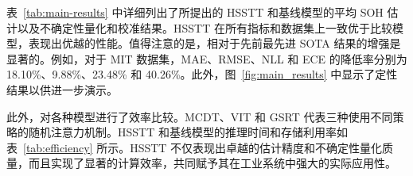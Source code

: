 \documentclass[UTF8,journal,twoside,web]{ieeecolor}
\begin{document}


表~\ref{tab:main-results} 中详细列出了所提出的 HSSTT 和基线模型的平均 SOH 估计以及不确定性量化和校准结果。HSSTT 在所有指标和数据集上一致优于比较模型，表现出优越的性能。值得注意的是，相对于先前最先进 SOTA 结果的增强是显著的。例如，对于 MIT 数据集，MAE、RMSE、NLL 和 ECE 的降低率分别为 18.10\%、9.88\%、23.48\% 和 40.26\%。此外，图~\ref{fig:main_results} 中显示了定性结果以供进一步演示。

此外，对各种模型进行了效率比较。MCDT\cite{20164903082858}、VIT\cite{20191806851746} 和 GSRT\cite{20193407356730} 代表三种使用不同策略的随机注意力机制。HSSTT 和基线模型的推理时间和存储利用率如表~\ref{tab:efficiency} 所示。HSSTT 不仅表现出卓越的估计精度和不确定性量化质量，而且实现了显著的计算效率，共同赋予其在工业系统中强大的实际应用性。
\end{document}
